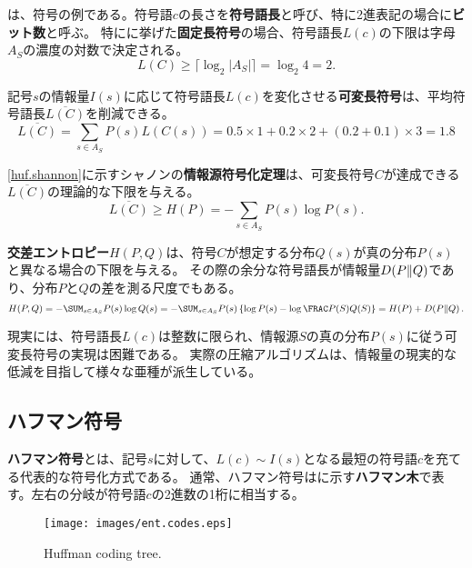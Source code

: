 \documentclass[10pt,a4paper]{book}
\begin{document}
は、符号の例である。符号語$c$の長さを\textbf{符号語長}と呼び、特に2進表記の場合に\textbf{ビット数}と呼ぶ。
特にに挙げた\textbf{固定長符号}の場合、符号語長$L(c)$の下限は字母$A_S$の濃度の対数で決定される。
%
\begin{equation}
L(C) \ge \lceil \log_2 |A_S| \rceil = \log_2 4 = 2.
\end{equation}

記号$s$の情報量$I(s)$に応じて符号語長$L(c)$を変化させる\textbf{可変長符号}は、平均符号語長$\overline{L(C)}$を削減できる。
%
\begin{equation}
\overline{L(C)} = \sum_{s \in A_S} P(s) L(C(s)) = 0.5 \times 1 + 0.2 \times 2 + (0.2 + 0.1) \times 3 = 1.8
\end{equation}

\eqref{huf.shannon}に示すシャノンの\textbf{情報源符号化定理}は、可変長符号$C$が達成できる$\overline{L(C)}$の理論的な下限を与える。
%
\begin{equation}
\label{eq:huf.shannon}
\overline{L(C)} \geq H(P) = -\sum_{s \in A_S} P(s) \log P(s).
\end{equation}

\textbf{交差エントロピー}$H(P,Q)$は、符号$C$が想定する分布$Q(s)$が真の分布$P(s)$と異なる場合の下限を与える。
その際の余分な符号語長が\nKL 情報量$D\!\left(P\|Q\right)$であり、分布$P$と$Q$の差を測る尺度でもある。
%
\begin{equation}
\label{eq:huf.ce}
H(P,Q)
= -\sum_{s \in A_S} P(s) \log Q(s)
= -\sum_{s \in A_S} P(s) \left\{\log P(s) - \log\frac{P(S)}{Q(S)}\right\}
= H(P) + \KL{P}{Q}.
\end{equation}

現実には、符号語長$L(c)$は整数に限られ、情報源$S$の真の分布$P(s)$に従う可変長符号の実現は困難である。
実際の圧縮アルゴリズムは、\nKL 情報量の現実的な低減を目指して様々な亜種が派生している。

\subsection{ハフマン符号}

\textbf{ハフマン符号}とは、記号$s$に対して、$L(c)\!\sim\!I(s)$となる最短の符号語$c$を充てる代表的な符号化方式である。
通常、ハフマン符号はに示す\textbf{ハフマン木}で表す。左右の分岐が符号語$c$の2進数の1桁に相当する。

\begin{figure}[h]
\centering
\texttt{[image: images/ent.codes.eps]}
\caption{Huffman coding tree.\label{fig:huff}}
\end{figure}
\end{document}
